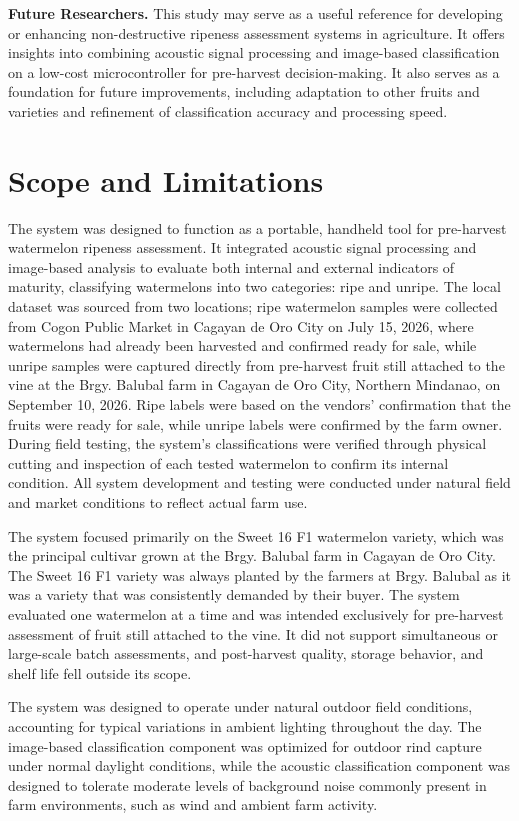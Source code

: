 \begin{thesisprose}
\textbf{Future Researchers.} This study may serve as a useful reference for developing or enhancing non-destructive ripeness assessment systems in agriculture. It offers insights into combining acoustic signal processing and image-based classification on a low-cost microcontroller for pre-harvest decision-making. It also serves as a foundation for future improvements, including adaptation to other fruits and varieties and refinement of classification accuracy and processing speed.

\section{Scope and Limitations}

The system was designed to function as a portable, handheld tool for pre-harvest watermelon ripeness assessment. It integrated acoustic signal processing and image-based analysis to evaluate both internal and external indicators of maturity, classifying watermelons into two categories: ripe and unripe. The local dataset was sourced from two locations; ripe watermelon samples were collected from Cogon Public Market in Cagayan de Oro City on July 15, 2026, where watermelons had already been harvested and confirmed ready for sale, while unripe samples were captured directly from pre-harvest fruit still attached to the vine at the Brgy. Balubal farm in Cagayan de Oro City, Northern Mindanao, on September 10, 2026. Ripe labels were based on the vendors’ confirmation that the fruits were ready for sale, while unripe labels were confirmed by the farm owner. During field testing, the system’s classifications were verified through physical cutting and inspection of each tested watermelon to confirm its internal condition. All system development and testing were conducted under natural field and market conditions to reflect actual farm use.

The system focused primarily on the Sweet 16 F1 watermelon variety, which was the principal cultivar grown at the Brgy. Balubal farm in Cagayan de Oro City. The Sweet 16 F1 variety was always planted by the farmers at Brgy. Balubal as it was a variety that was consistently demanded by their buyer. The system evaluated one watermelon at a time and was intended exclusively for pre-harvest assessment of fruit still attached to the vine. It did not support simultaneous or large-scale batch assessments, and post-harvest quality, storage behavior, and shelf life fell outside its scope.

The system was designed to operate under natural outdoor field conditions, accounting for typical variations in ambient lighting throughout the day. The image-based classification component was optimized for outdoor rind capture under normal daylight conditions, while the acoustic classification component was designed to tolerate moderate levels of background noise commonly present in farm environments, such as wind and ambient farm activity.


\end{thesisprose}
